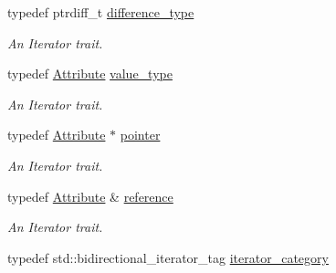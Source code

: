 \begin{DoxyCompactItemize}
\item 
\hypertarget{classphys_1_1xml_1_1AttributeIterator_a9ce268d2fe4a507c7a9b3f687cbc7dbf}{
typedef ptrdiff\_\-t \hyperlink{classphys_1_1xml_1_1AttributeIterator_a9ce268d2fe4a507c7a9b3f687cbc7dbf}{difference\_\-type}}
\label{de/d78/classphys_1_1xml_1_1AttributeIterator_a9ce268d2fe4a507c7a9b3f687cbc7dbf}

\begin{DoxyCompactList}\small\item\em An Iterator trait. \item\end{DoxyCompactList}\item 
\hypertarget{classphys_1_1xml_1_1AttributeIterator_a2802171caa10acb5b47bca7576f346f7}{
typedef \hyperlink{classphys_1_1xml_1_1Attribute}{Attribute} \hyperlink{classphys_1_1xml_1_1AttributeIterator_a2802171caa10acb5b47bca7576f346f7}{value\_\-type}}
\label{de/d78/classphys_1_1xml_1_1AttributeIterator_a2802171caa10acb5b47bca7576f346f7}

\begin{DoxyCompactList}\small\item\em An Iterator trait. \item\end{DoxyCompactList}\item 
\hypertarget{classphys_1_1xml_1_1AttributeIterator_a87ea5bf9f43a66eca8675625486376ab}{
typedef \hyperlink{classphys_1_1xml_1_1Attribute}{Attribute} $\ast$ \hyperlink{classphys_1_1xml_1_1AttributeIterator_a87ea5bf9f43a66eca8675625486376ab}{pointer}}
\label{de/d78/classphys_1_1xml_1_1AttributeIterator_a87ea5bf9f43a66eca8675625486376ab}

\begin{DoxyCompactList}\small\item\em An Iterator trait. \item\end{DoxyCompactList}\item 
\hypertarget{classphys_1_1xml_1_1AttributeIterator_a55e06f521ba2e8a78bd77f447c172a3f}{
typedef \hyperlink{classphys_1_1xml_1_1Attribute}{Attribute} \& \hyperlink{classphys_1_1xml_1_1AttributeIterator_a55e06f521ba2e8a78bd77f447c172a3f}{reference}}
\label{de/d78/classphys_1_1xml_1_1AttributeIterator_a55e06f521ba2e8a78bd77f447c172a3f}

\begin{DoxyCompactList}\small\item\em An Iterator trait. \item\end{DoxyCompactList}\item 
\hypertarget{classphys_1_1xml_1_1AttributeIterator_ab731cb4734fb2f2d6e1f3e106ac97ee3}{
typedef std::bidirectional\_\-iterator\_\-tag \hyperlink{classphys_1_1xml_1_1AttributeIterator_ab731cb4734fb2f2d6e1f3e106ac97ee3}{iterator\_\-category}}
\label{de/d78/classphys_1_1xml_1_1AttributeIterator_ab731cb4734fb2f2d6e1f3e106ac97ee3}


\end{DoxyCompactItemize}

